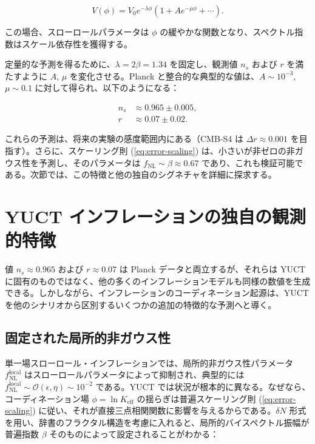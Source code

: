 \documentclass[11pt,a4paper]{article}
\newcommand{\Keff}{K_{\mathrm{eff}}}
\newcommand{\rs}{r}
\begin{document}
	\begin{equation}
		V(\phi) = V_0 e^{-\lambda \phi} \left(1 + A e^{-\mu \phi} + \cdots \right).
	\end{equation}
	
	この場合、スローロールパラメータは \(\phi\) の緩やかな関数となり、スペクトル指数はスケール依存性を獲得する。
	
	定量的な予測を得るために、\(\lambda = 2\beta = 1.34\) を固定し、観測値 \(n_s\) および \(\rs\) を満たすように \(A\), \(\mu\) を変化させる。Planck と整合的な典型的な値は、\(A \sim 10^{-3}\), \(\mu \sim 0.1\) に対して得られ、以下のようになる：
	
	\begin{align}
		n_s &\approx 0.965 \pm 0.005, \\
		\rs &\approx 0.07 \pm 0.02.
	\end{align}
	
	これらの予測は、将来の実験の感度範囲内にある（CMB‑S4 は \(\Delta r \approx 0.001\) を目指す）。さらに、スケーリング則 (\ref{eq:error-scaling}) は、小さいが非ゼロの非ガウス性を予測し、そのパラメータは \(f_{\mathrm{NL}} \sim \beta \approx 0.67\) であり、これも検証可能である。次節では、この特徴と他の独自のシグネチャを詳細に探求する。
	
	\section{YUCT インフレーションの独自の観測的特徴}
	\label{sec:signatures}
	
	値 \(n_s \approx 0.965\) および \(r \approx 0.07\) は Planck データと両立するが、それらは YUCT に固有のものではなく、他の多くのインフレーションモデルも同様の数値を生成できる。しかしながら、インフレーションのコーディネーション起源は、YUCT を他のシナリオから区別するいくつかの追加の特徴的な予測へと導く。
	
	\subsection{固定された局所的非ガウス性}
	
	単一場スローロール・インフレーションでは、局所的非ガウス性パラメータ \(f_{\text{NL}}^{\text{local}}\) はスローロールパラメータによって抑制され、典型的には \(f_{\text{NL}}^{\text{local}} \sim \mathcal{O}(\epsilon, \eta) \sim 10^{-2}\) である。YUCT では状況が根本的に異なる。なぜなら、コーディネーション場 \(\phi = \ln \Keff\) の揺らぎは普遍スケーリング則 (\ref{eq:error-scaling}) に従い、それが直接三点相関関数に影響を与えるからである。\(\delta N\) 形式を用い、辞書のフラクタル構造を考慮に入れると、局所的バイスペクトル振幅が普遍指数 \(\beta\) そのものによって設定されることがわかる：
	
\end{document}

